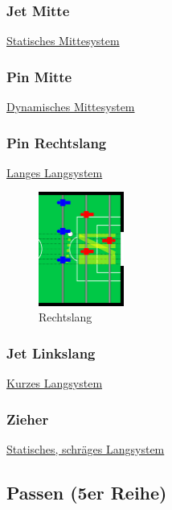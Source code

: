 \subsubsection{Jet Mitte}
\href{http://ungeblogtkickern.blogspot.de/2015/06/system-jet-mitte.htmli}{
Statisches Mittesystem}
\subsubsection{Pin Mitte}
\href{http://ungeblogtkickern.blogspot.de/2015/08/system-pin-mitte.html}{
Dynamisches Mittesystem}
\subsubsection{Pin Rechtslang}
\href{http://ungeblogtkickern.blogspot.de/2015/07/system-pin-rechtslang.html}{
Langes Langsystem}

\begin{figure}
\centering 
\includegraphics[width=0.25\textwidth]{img/schuss3er_lang.png} 
\caption{Rechtslang} 
\label{fig:rod-lock} 
\end{figure}

\subsubsection{Jet Linkslang}
\href{http://ungeblogtkickern.blogspot.de/2015/07/system-jet-linkslang.html}{
Kurzes Langsystem}
\subsubsection{Zieher}
\href{http://ungeblogtkickern.blogspot.de/2015/09/system-zieher.html}{
Statisches, schräges Langsystem}

 
\subsection{Passen (5er Reihe)}
\label{taktik:offensive:sturm}

